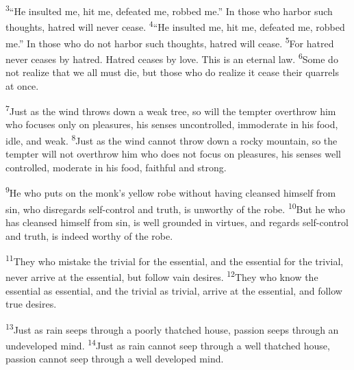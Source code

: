 \documentclass[openany,12pt,english]{book}
\newenvironment{para}{\par\pretolerance=100\tolerance=200\setlength{\emergencystretch}{0.6em}\relax}{\par}
\begin{document}
\begin{para}
    \textsuperscript{3}\thinspace{}“He insulted me, hit me, defeated me, robbed me.” In those who har\-bor such thoughts, ha\-tred will nev\-er cease.
    \textsuperscript{4}\thinspace{}“He insulted me, hit me, defeated me, robbed me.” In those who do not har\-bor such thoughts, ha\-tred will cease.
    \textsuperscript{5}\thinspace{}For ha\-tred nev\-er ceases by ha\-tred. Ha\-tred ceases by love. This is an e\-ter\-nal law.
    \textsuperscript{6}\thinspace{}Some do not re\-al\-ize that we all must die, but those who do re\-al\-ize it cease their quarrels at once.
\end{para}

\begin{para}
    \textsuperscript{7}\thinspace{}Just as the wind throws down a weak tree, so will the temp\-ter o\-ver\-throw him who fo\-cus\-es on\-ly on pleasures, his sen\-ses un\-con\-trolled, im\-mod\-er\-ate in his food, i\-dle, and weak.
    \textsuperscript{8}\thinspace{}Just as the wind can\-not throw down a rock\-y moun\-tain, so the temp\-ter will not o\-ver\-throw him who does not fo\-cus on pleasures, his sen\-ses well con\-trolled, mod\-er\-ate in his food, faith\-ful and strong.
\end{para}

\begin{para}
    \textsuperscript{9}\thinspace{}He who puts on the monk's yel\-low robe with\-out hav\-ing cleansed him\-self from sin, who disregards self-control and truth, is un\-wor\-thy of the robe.
    \textsuperscript{10}\thinspace{}But he who has cleansed him\-self from sin, is well grounded in vir\-tues, and regards self-control and truth, is in\-deed wor\-thy of the robe.
\end{para}

\begin{para}
    \textsuperscript{11}\thinspace{}They who mis\-take the triv\-i\-al for the es\-sen\-tial, and the es\-sen\-tial for the triv\-i\-al, nev\-er ar\-rive at the es\-sen\-tial, but fol\-low vain desires.
    \textsuperscript{12}\thinspace{}They who know the es\-sen\-tial as es\-sen\-tial, and the triv\-i\-al as triv\-i\-al, ar\-rive at the es\-sen\-tial, and fol\-low true desires.
\end{para}

\begin{para}
    \textsuperscript{13}\thinspace{}Just as rain seeps through a poor\-ly tha\-tched house, pas\-sion seeps through an undeveloped mind.
    \textsuperscript{14}\thinspace{}Just as rain can\-not seep through a well tha\-tched house, pas\-sion can\-not seep through a well de\-vel\-oped mind.
\end{para}
\end{document}
